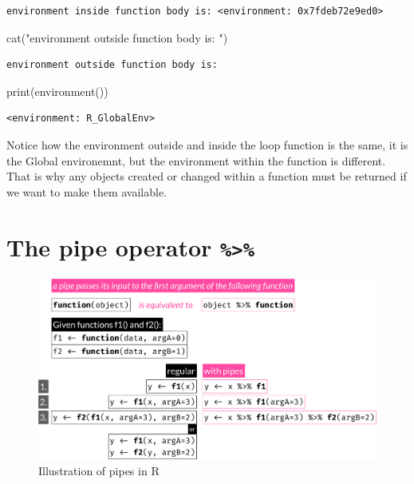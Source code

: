 \documentclass[
]{book}
\newenvironment{Shaded}{\begin{snugshade}}{\end{snugshade}}
\newcommand{\FunctionTok}[1]{\textcolor[rgb]{0.00,0.00,0.00}{#1}}
\newcommand{\NormalTok}[1]{#1}
\newcommand{\StringTok}[1]{\textcolor[rgb]{0.31,0.60,0.02}{#1}}
\begin{document}
\begin{verbatim}
environment inside function body is: <environment: 0x7fdeb72e9ed0>
\end{verbatim}

\begin{Shaded}
\begin{Highlighting}[]
\FunctionTok{cat}\NormalTok{(}\StringTok{"environment outside function body is: "}\NormalTok{)}
\end{Highlighting}
\end{Shaded}

\begin{verbatim}
environment outside function body is: 
\end{verbatim}

\begin{Shaded}
\begin{Highlighting}[]
\FunctionTok{print}\NormalTok{(}\FunctionTok{environment}\NormalTok{())}
\end{Highlighting}
\end{Shaded}

\begin{verbatim}
<environment: R_GlobalEnv>
\end{verbatim}

Notice how the environment outside and inside the loop function is the same, it is the Global environemnt, but the environment within the function is different. That is why any objects created or changed within a function must be returned if we want to make them available.

\hypertarget{pipe}{%
\section{\texorpdfstring{The pipe operator \texttt{\%\textgreater{}\%}}{The pipe operator \%\textgreater\%}}\label{pipe}}

\begin{figure}

{\centering \includegraphics[width=0.8\linewidth]{./R_pipes} 

}

\caption{Illustration of pipes in R}\label{fig:FigRpipes}
\end{figure}
\end{document}
